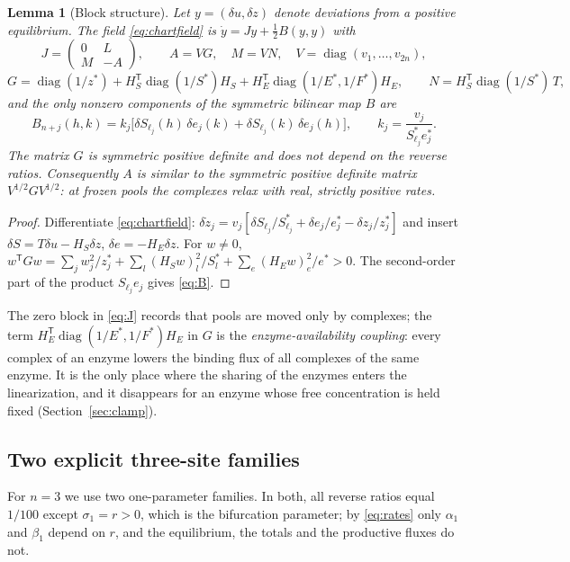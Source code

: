 \documentclass[11pt,a4paper]{article}
\theoremstyle{plain}
\newtheorem{lemma}[theorem]{Lemma}
\theoremstyle{definition}
\theoremstyle{remark}
\newcommand{\T}{\mathsf T}
\DeclareMathOperator{\diag}{diag}
\begin{document}
\begin{lemma}[Block structure]\label{lem:blocks}
Let $y=(\delta u,\delta z)$ denote deviations from a positive equilibrium. The field \eqref{eq:chartfield} is $\dot y=Jy+\tfrac12B(y,y)$ with
\begin{equation}\label{eq:J}
 J=\begin{pmatrix}0&L\\ M&-A\end{pmatrix},\qquad A=VG,\quad M=VN,\quad V=\diag(v_1,\dots,v_{2n}),
\end{equation}
\begin{equation}\label{eq:GN}
 G=\diag(1/z^*)+H_S^{\T}\diag(1/S^*)H_S+H_E^{\T}\diag(1/E^*,1/F^*)H_E,\qquad N=H_S^{\T}\diag(1/S^*)\,T ,
\end{equation}
and the only nonzero components of the symmetric bilinear map $B$ are
\begin{equation}\label{eq:B}
 B_{n+j}(h,k)=k_j\bigl[\delta S_{\ell_j}(h)\,\delta e_j(k)+\delta S_{\ell_j}(k)\,\delta e_j(h)\bigr],\qquad k_j=\frac{v_j}{S_{\ell_j}^*e_j^*}.
\end{equation}
The matrix $G$ is symmetric positive definite and does not depend on the reverse ratios. Consequently $A$ is similar to the symmetric positive definite matrix $V^{1/2}GV^{1/2}$: at frozen pools the complexes relax with real, strictly positive rates.
\end{lemma}
\begin{proof}
Differentiate \eqref{eq:chartfield}: $\delta\dot z_j=v_j[\delta S_{\ell_j}/S^*_{\ell_j}+\delta e_j/e_j^*-\delta z_j/z_j^*]$ and insert $\delta S=T\delta u-H_S\delta z$, $\delta e=-H_E\delta z$. For $w\ne0$, $w^{\T}Gw=\sum_jw_j^2/z_j^*+\sum_l(H_Sw)_l^2/S_l^*+\sum_e(H_Ew)_e^2/e^*>0$. The second-order part of the product $S_{\ell_j}e_j$ gives \eqref{eq:B}.
\end{proof}
The zero block in \eqref{eq:J} records that pools are moved only by complexes; the term $H_E^{\T}\diag(1/E^*,1/F^*)H_E$ in $G$ is the \emph{enzyme-availability coupling}: every complex of an enzyme lowers the binding flux of all complexes of the same enzyme. It is the only place where the sharing of the enzymes enters the linearization, and it disappears for an enzyme whose free concentration is held fixed (Section~\ref{sec:clamp}).

\subsection{Two explicit three-site families}\label{sec:witnesses}
For $n=3$ we use two one-parameter families. In both, all reverse ratios equal $1/100$ except $\sigma_1=r>0$, which is the bifurcation parameter; by \eqref{eq:rates} only $\alpha_1$ and $\beta_1$ depend on $r$, and the equilibrium, the totals and the productive fluxes do not.
\end{document}
